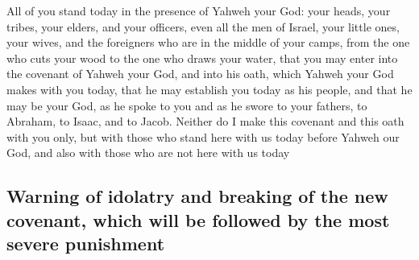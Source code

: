 \begin{paracol}{2}
\begin{otherlanguage}{english}
 All of you stand today in the presence of Yahweh your
God: your heads, your tribes, your elders, and your officers, even all
the men of Israel,  your little ones, your wives, and the
foreigners who are in the middle of your camps, from the one who cuts
your wood to the one who draws your water,  that you may
enter into the covenant of Yahweh your God, and into his oath, which
Yahweh your God makes with you today,  that he may
establish you today as his people, and that he may be your God, as he
spoke to you and as he swore to your fathers, to Abraham, to Isaac, and
to Jacob.  Neither do I make this covenant and this oath
with you only,  but with those who stand here with us
today before Yahweh our God, and also with those who are not here with
us today

\hypertarget{warning-of-idolatry-and-breaking-of-the-new-covenant-which-will-be-followed-by-the-most-severe-punishment}{%
\subsection{Warning of idolatry and breaking of the new covenant, which
will be followed by the most severe
punishment}\label{warning-of-idolatry-and-breaking-of-the-new-covenant-which-will-be-followed-by-the-most-severe-punishment}}


\end{otherlanguage}
\end{paracol}
